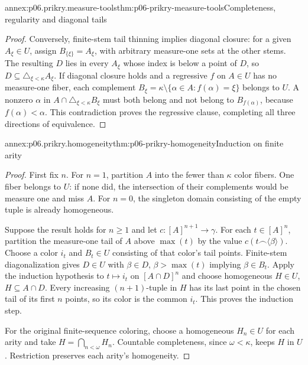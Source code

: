 \begin{annexitem}{annex:p06.prikry.measure-tools}{thm:p06-prikry-measure-tools}{Completeness, regularity and diagonal tails}
\begin{proof}
Conversely, finite-stem tail thinning implies diagonal closure: for a
given \(A_\xi\in U\), assign \(B_{\{\xi\}}=A_\xi\), with arbitrary
measure-one sets at the other stems. The resulting \(D\) lies in every
\(A_\xi\) whose index is below a point of \(D\), so
\(D\subseteq\triangle_{\xi<\kappa}A_\xi\).
If diagonal closure holds and a regressive \(f\) on \(A\in U\) has
no measure-one fiber, each complement
\(B_\xi=\kappa\setminus\{\alpha\in A:f(\alpha)=\xi\}\) belongs
to \(U\). A nonzero \(\alpha\) in
\(A\cap\triangle_{\xi<\kappa}B_\xi\) must both belong and not
belong to \(B_{f(\alpha)}\), because \(f(\alpha)<\alpha\).
This contradiction proves the regressive clause, completing all three
directions of equivalence.
\end{proof}
\end{annexitem}

\begin{annexitem}{annex:p06.prikry.homogeneity}{thm:p06-prikry-homogeneity}{Induction on finite arity}
\begin{proof}
First fix \(n\). For \(n=1\), partition \(A\) into the fewer than
\(\kappa\) color fibers. One fiber belongs to \(U\): if none did,
the intersection of their complements would be measure one and miss
\(A\). For \(n=0\), the singleton domain consisting of the empty
tuple is already homogeneous.

Suppose the result holds for \(n\geq1\) and let
\(c:[A]^{n+1}\to\gamma\). For each \(t\in[A]^n\), partition the
measure-one tail of \(A\) above \(\max(t)\) by the value
\(c(t\mathbin{\frown}\langle\beta\rangle)\). Choose a color \(i_t\)
and \(B_t\in U\) consisting of that color's tail points. Finite-stem
diagonalization gives \(D\in U\) with
\(\beta\in D\), \(\beta>\max(t)\) implying \(\beta\in B_t\).
Apply the induction hypothesis to \(t\mapsto i_t\) on \([A\cap D]^n\)
and choose homogeneous \(H\in U\), \(H\subseteq A\cap D\).
Every increasing \((n+1)\)-tuple in \(H\) has its last point in the
chosen tail of its first \(n\) points, so its color is the common
\(i_t\). This proves the induction step.

For the original finite-sequence coloring, choose a homogeneous
\(H_n\in U\) for each arity and take \(H=\bigcap_{n<\omega}H_n\).
Countable completeness, since \(\omega<\kappa\), keeps \(H\) in
\(U\). Restriction preserves each arity's homogeneity.
\end{proof}
\end{annexitem}

